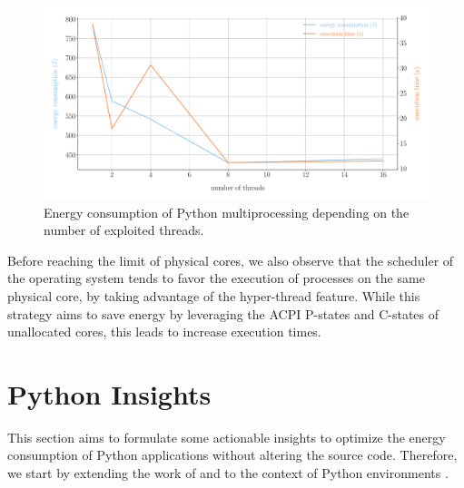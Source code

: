 \begin{figure}[hbt]
    \centering
    \includegraphics[width=\linewidth]{imgs/multiprocessing_energyvstime}
    \caption{Energy consumption of Python multiprocessing depending on the number of exploited threads.}
    \label{fig:python_multiprocessing}
\end{figure}

Before reaching the limit of physical cores, we also observe that the scheduler of the operating system tends to favor the execution of processes on the same physical core, by taking advantage of the hyper-thread feature.
While this strategy aims to save energy by leveraging the ACPI P-states and C-states of unallocated cores, this leads to increase execution times.



\section{Python Insights}
This section aims to formulate some actionable insights to optimize the energy consumption of Python applications without altering the source code.
Therefore, we start by extending the work of \citeauthor{hasan_energy_2016} and
\citeauthor{oliveira_recommending_nodate} to the context of Python environments
\cite{hasan_energy_2016,oliveira_recommending_nodate}.
